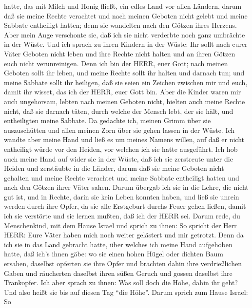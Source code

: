hatte, das mit Milch und Honig fließt, ein edles Land vor allen Ländern,
 darum daß sie meine Rechte verachtet und nach meinen
Geboten nicht gelebt und meine Sabbate entheiligt hatten; denn sie
wandelten nach den Götzen ihres Herzens.  Aber mein Auge
verschonte sie, daß ich sie nicht verderbte noch ganz umbrächte in der
Wüste.  Und ich sprach zu ihren Kindern in der Wüste: Ihr
sollt nach eurer Väter Geboten nicht leben und ihre Rechte nicht halten
und an ihren Götzen euch nicht verunreinigen.  Denn ich bin
der HERR, euer Gott; nach meinen Geboten sollt ihr leben, und meine
Rechte sollt ihr halten und darnach tun;  und meine Sabbate
sollt ihr heiligen, daß sie seien ein Zeichen zwischen mir und euch,
damit ihr wisset, das ich der HERR, euer Gott bin.  Aber
die Kinder waren mir auch ungehorsam, lebten nach meinen Geboten nicht,
hielten auch meine Rechte nicht, daß sie darnach täten, durch welche der
Mensch lebt, der sie hält, und entheiligten meine Sabbate. Da gedachte
ich, meinen Grimm über sie auszuschütten und allen meinen Zorn über sie
gehen lassen in der Wüste.  Ich wandte aber meine Hand und
ließ es um meines Namens willen, auf daß er nicht entheiligt würde vor
den Heiden, vor welchen ich sie hatte ausgeführt.  Ich hob
auch meine Hand auf wider sie in der Wüste, daß ich sie zerstreute unter
die Heiden und zerstäubte in die Länder,  darum daß sie
meine Geboten nicht gehalten und meine Rechte verachtet und meine
Sabbate entheiligt hatten und nach den Götzen ihrer Väter sahen.
 Darum übergab ich sie in die Lehre, die nicht gut ist, und
in Rechte, darin sie kein Leben konnten haben,  und ließ
sie unrein werden durch ihre Opfer, da sie alle Erstgeburt durchs Feuer
gehen ließen, damit ich sie verstörte und sie lernen mußten, daß ich der
HERR sei.  Darum rede, du Menschenkind, mit dem Hause
Israel und sprich zu ihnen: So spricht der Herr HERR: Eure Väter haben
mich noch weiter gelästert und mir getrotzt.  Denn da ich
sie in das Land gebracht hatte, über welches ich meine Hand aufgehoben
hatte, daß ich's ihnen gäbe: wo sie einen hohen Hügel oder dichten Baum
ersahen, daselbst opferten sie ihre Opfer und brachten dahin ihre
verdrießlichen Gaben und räucherten daselbst ihren süßen Geruch und
gossen daselbst ihre Trankopfer.  Ich aber sprach zu ihnen:
Was soll doch die Höhe, dahin ihr geht? Und also heißt sie bis auf
diesen Tag ``die Höhe''.  Darum sprich zum Hause Israel: So

